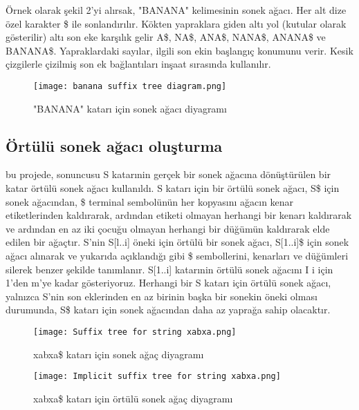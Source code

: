 \documentclass[conference]{IEEEtran}
\begin{document}
Örnek olarak şekil 2'yi alırsak, "BANANA" kelimesinin sonek ağacı. Her alt dize özel karakter \$ ile sonlandırılır. Kökten yapraklara giden altı yol (kutular olarak gösterilir) altı son eke karşılık gelir A\$, NA\$, ANA\$, NANA\$, ANANA\$ ve BANANA\$. Yapraklardaki sayılar, ilgili son ekin başlangıç konumunu verir. Kesik çizgilerle çizilmiş son ek bağlantıları inşaat sırasında kullanılır.

\begin{figure}[h]
    \centering
    \texttt{[image: banana suffix tree diagram.png]}
    \caption{"BANANA" katarı için sonek ağacı diyagramı}
    \label{Şekil:2}
\end{figure}


\subsection{\textbf{\Large Örtülü sonek ağacı oluşturma}}\label{AA}
bu projede, sonuncusu S katarınin gerçek bir sonek ağacına dönüştürülen bir katar örtülü sonek ağacı kullanıldı.
S katarı için bir örtülü sonek ağacı, S\$ için sonek ağacından, \$ terminal sembolünün her kopyasını ağacın kenar etiketlerinden kaldırarak, ardından etiketi olmayan herhangi bir kenarı kaldırarak ve ardından en az iki çocuğu olmayan herhangi bir düğümün kaldırarak elde edilen bir ağaçtır. S'nin S[l..i] öneki için örtülü bir sonek ağacı, S[1..i]\$ için sonek ağacı alınarak ve yukarıda açıklandığı gibi \$ sembollerini, kenarları ve düğümleri silerek benzer şekilde tanımlanır. S[1..i] katarınin örtülü sonek ağacını I i için 1'den m'ye kadar gösteriyoruz. Herhangi bir S katarı için örtülü sonek ağacı, yalnızca S'nin son eklerinden en az birinin başka bir sonekin öneki olması durumunda, S\$ katarı için sonek ağacından daha az yaprağa sahip olacaktır.\\

\begin{figure}[h]
    \centering
    \texttt{[image: Suffix tree for string xabxa.png]}
    \caption{xabxa\$ katarı  için sonek ağaç diyagramı}
    \label{Şekil:3}
\end{figure}

\begin{figure}[h]
    \centering
    \texttt{[image: Implicit suffix tree for string xabxa.png]}
    \caption{xabxa\$ katarı  için örtülü sonek ağaç diyagramı}
    \label{Şekil:4}
\end{figure}
\end{document}
